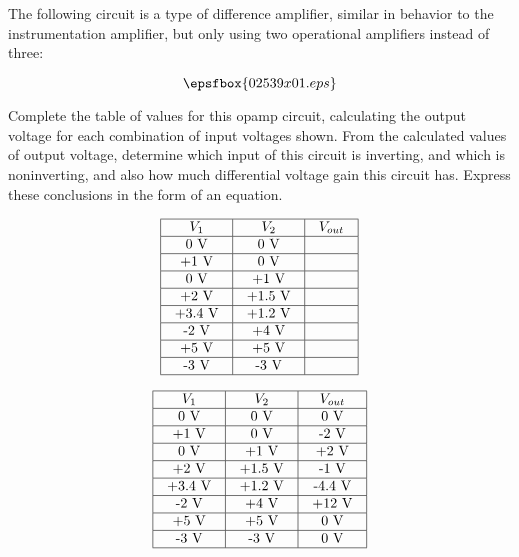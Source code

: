 

The following circuit is a type of difference amplifier, similar in behavior to the instrumentation amplifier, but only using two operational amplifiers instead of three:

$$\epsfbox{02539x01.eps}$$

Complete the table of values for this opamp circuit, calculating the output voltage for each combination of input voltages shown.  From the calculated values of output voltage, determine which input of this circuit is inverting, and which is noninverting, and also how much differential voltage gain this circuit has.  Express these conclusions in the form of an equation.


$$\vbox{\offinterlineskip
\halign{\strut
\vrule \quad\hfil # \ \hfil & 
\vrule \quad\hfil # \ \hfil & 
\vrule \quad\hfil # \ \hfil \vrule \cr
\noalign{\hrule}
%
$V_1$ & $V_2$ & $V_{out}$ \cr
%
\noalign{\hrule}
%
0 V & 0 V &  \cr
%
\noalign{\hrule}
%
+1 V & 0 V &  \cr
%
\noalign{\hrule}
%
0 V & +1 V &  \cr
%
\noalign{\hrule}
%
+2 V & +1.5 V &  \cr
%
\noalign{\hrule}
%
+3.4 V & +1.2 V &  \cr
%
\noalign{\hrule}
%
-2 V & +4 V &  \cr
%
\noalign{\hrule}
%
+5 V & +5 V &  \cr
%
\noalign{\hrule}
%
-3 V & -3 V &  \cr
%
\noalign{\hrule}
} %
}$$ %








$$\vbox{\offinterlineskip
\halign{\strut
\vrule \quad\hfil # \ \hfil & 
\vrule \quad\hfil # \ \hfil & 
\vrule \quad\hfil # \ \hfil \vrule \cr
\noalign{\hrule}
%
$V_1$ & $V_2$ & $V_{out}$ \cr
%
\noalign{\hrule}
%
0 V & 0 V & 0 V \cr
%
\noalign{\hrule}
%
+1 V & 0 V & -2 V \cr
%
\noalign{\hrule}
%
0 V & +1 V & +2 V \cr
%
\noalign{\hrule}
%
+2 V & +1.5 V & -1 V \cr
%
\noalign{\hrule}
%
+3.4 V & +1.2 V & -4.4 V \cr
%
\noalign{\hrule}
%
-2 V & +4 V & +12 V \cr
%
\noalign{\hrule}
%
+5 V & +5 V & 0 V \cr
%
\noalign{\hrule}
%
-3 V & -3 V & 0 V \cr
%
\noalign{\hrule}
} %
}$$ %

